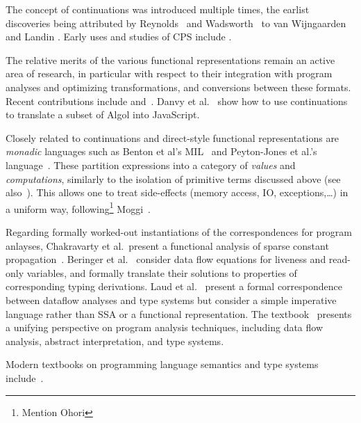 The concept of continuations was introduced multiple times, the
earlist discoveries being attributed by
Reynolds~\cite{Reynolds:LSC1993} and Wadsworth~\cite{Wadsworth00} to
van Wijngaarden
\cite{vanWijngaarden1966} and Landin \cite{Landin1965}. Early uses
and studies of CPS include \cite{Reynolds:1972,Plotkin75}.  

The relative merits of the various functional representations remain
an active area of research, in particular with respect to their
integration with program analyses and optimizing transformations, and
conversions between these formats. Recent contributions include
\cite{DBLP:journals/jfp/DanvyMN07} and~\cite{DBLP:journals/lisp/Reppy02}. 
Danvy et al.~\cite{DBLP:conf/dsl/DanvySZ09} show how to use
continuations to translate a subset of Algol into JavaScript.

Closely related to continuations and direct-style functional
representations are
\emph{monadic} languages such as Benton et al's MIL~\cite{BentonKennedyRussel:ICFP1998} and  Peyton-Jones et al.'s language~\cite{PeytonJonesShieldsLT:POPL1998}. These partition expressions into a category of \emph{values} and \emph{computations}, similarly to the isolation of primitive terms discussed above (see also~\cite{Reynolds1974,Plotkin75}). This allows one to treat side-effects (memory access, IO, exceptions,\ldots) in a uniform way, following\footnote{Mention Ohori} Moggi~\cite{Moggi1991}. 

Regarding formally worked-out instantiations of the correspondences
for program anlayses, Chakravarty et al.~present a functional analysis
of sparse constant propagation~\cite{ChakravartyKZ:COCV03}. Beringer
et al.~\cite{DBLP:journals/entcs/BeringerMS03} consider data flow
equations for liveness and read-only variables, and formally translate
their solutions to properties of corresponding typing
derivations. Laud et al.~\cite{DBLP:journals/tcs/LaudUV06} present a
formal correspondence between dataflow analyses and type systems but
consider a simple imperative language rather than SSA or a functional
representation. The textbook~\cite{NielsonNielsonHanking:POPA}
presents a unifying perspective on program analysis techniques,
including data flow analysis, abstract interpretation, and type
systems.

Modern textbooks on programming language semantics and type systems
include~\cite{winskel_93_formal,GunterBook,PierceTAPL}.

%
%
